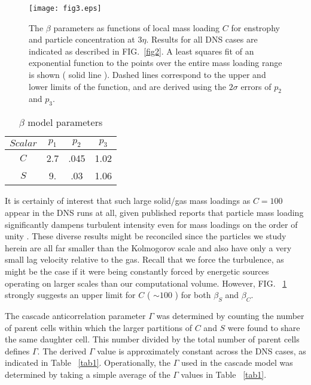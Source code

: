 \documentclass[aps,pra,twocolumn,groupedaddress,showkeys,showpacs,floatfix]{revtex4}
\begin{document}
\begin{figure}[h]
\begin{center}
\texttt{[image: fig3.eps]}
\caption{\label{fig3}The $\beta$ parameters as functions of local mass loading $C$ for enstrophy  
and particle concentration at $3\eta$.  Results for all      DNS cases are
indicated as described in FIG.~\ref{fig2}.      A least squares      fit of an
exponential function to the points over the      entire mass loading range is
shown ( solid line ). Dashed lines correspond to the upper      and lower limits
of the function, and are derived using the $2\sigma$ errors of $p_2$ and $p_3$.
}
\end{center}
\end{figure}





\begin{table}[h]
\begin{center}
\begin{tabular}{|c|c|c|c|}
\hline
$Scalar$ & $p_1$ & $p_2$ & $p_3$ \\
\hline
$C$   & 2.7   & .045  & 1.02   \\   
$S$   & 9.    & .03   & 1.06   \\
\hline
\end{tabular}
\caption{\label{tab2} $\beta$ model parameters } 
\end{center}
\end{table}



It is certainly of interest that such large solid/gas mass loadings as $C=100$
appear in the DNS runs at all, given published reports that particle mass
loading significantly dampens turbulent intensity even for mass loadings on the
order of unity \cite{Squires:4,Kulick:1}. These diverse results might be
reconciled since the particles we study herein are all far smaller than the
Kolmogorov scale
and also have only a very small lag velocity relative to
the gas. Recall that we force the turbulence, as might be the case if it were
being constantly forced by energetic sources operating on
larger scales than our computational volume. 
However, FIG. ~\ref{fig3} strongly suggests an upper limit for $C$ ( $\sim 100$ ) for
both $\beta_S$ and $\beta_C$. 




The cascade anticorrelation parameter $\Gamma$ was determined by counting the
number of   parent cells within which the larger partitions of $C$ and $S$ were
found to share  the same daughter cell. This number divided by the total number
of parent cells defines $\Gamma$.   The derived $\Gamma$ value is approximately
constant across the DNS cases, as indicated in Table ~\ref{tab1}. Operationally, the
$\Gamma$ used in the cascade model was determined by taking a simple average of
the $\Gamma$ values in Table ~\ref{tab1}.
\end{document}
